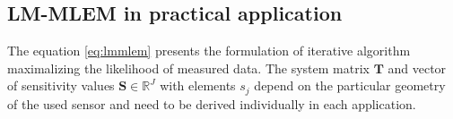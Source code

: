 \subsection{LM-MLEM in practical application}
The equation \ref{eq:lmmlem} presents the formulation of iterative algorithm maximalizing the likelihood of measured data.
The system matrix $\mathbf{T}$ and vector of sensitivity values $\mathbf{S} \in \mathbb{R}^{J}$ with elements $s_{j}$ depend on the particular geometry of the used sensor and need to be derived individually in each application.









